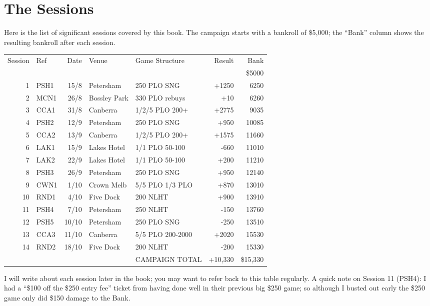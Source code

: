 \chapter{The Sessions}

Here is the list of significant sessions covered by this book. The
campaign starts with a bankroll of \$5,000; the ``Bank'' column shows
the resulting bankroll after each session.

\begin{tabular}{rlrllrr}
 Session & Ref & Date & Venue & Game Structure & Result & Bank \\
     &           &      &           &             &       & \$5000 \\
  1  &   PSH1    & 15/8 & Petersham & 250 PLO SNG & +1250 & 6250 \\
  2  &   MCN1    & 26/8 & Bossley Park & 330 PLO rebuys & +10 & 6260 \\
  3  &   CCA1    & 31/8 & Canberra  & 1/2/5 PLO 200+ & +2775 & 9035 \\
  4  &   PSH2    & 12/9 & Petersham & 250 PLO SNG & +950 & 10085 \\
  5  &   CCA2    & 13/9 & Canberra  & 1/2/5 PLO 200+ & +1575 & 11660 \\
  6  &   LAK1    & 15/9 & Lakes Hotel & 1/1 PLO 50-100 & -660 & 11010 \\
  7  &   LAK2    & 22/9 & Lakes Hotel & 1/1 PLO 50-100 & +200 & 11210 \\
  8  &   PSH3    & 26/9 & Petersham & 250 PLO SNG & +950 & 12140 \\
  9  &   CWN1    & 1/10 & Crown Melb & 5/5 PLO 1/3 PLO & +870 & 13010 \\
 10  &   RND1    & 4/10 & Five Dock & 200 NLHT & +900 & 13910 \\
 11  &   PSH4    & 7/10 & Petersham & 250 NLHT & -150 & 13760 \\
 12  &   PSH5    & 10/10 & Petersham & 250 PLO SNG & -250 & 13510 \\
 13  &   CCA3    & 11/10 & Canberra  & 5/5 PLO 200-2000 & +2020 & 15530 \\
 14  &   RND2    & 18/10 & Five Dock & 200 NLHT & -200 & 15330 \\
     &           &       &           & CAMPAIGN TOTAL & +10,330 & \$15,330 \\
\end{tabular}

I will write about each session later in the book; you may want to
refer back to this table regularly. A quick note on Session 11 (PSH4): I had
a ``\$100 off the \$250 entry fee'' ticket from having done well in
their previous big \$250 game; so although I busted out early the \$250
game only did \$150 damage to the Bank.
